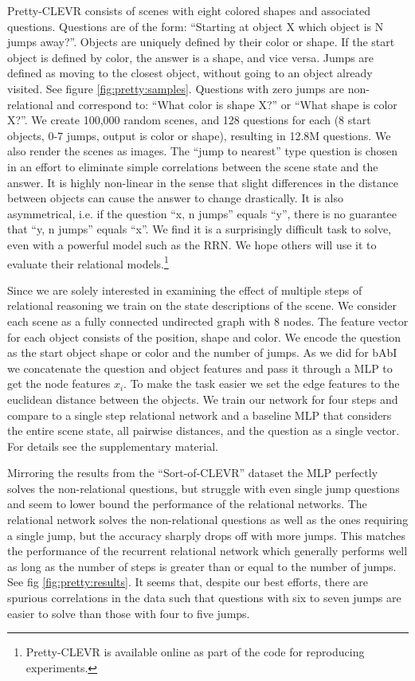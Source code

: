 \documentclass{article}
\begin{document}
Pretty-CLEVR consists of scenes with eight colored shapes and associated questions. Questions are of the form: ``Starting at object X which object is N jumps away?''. Objects are uniquely defined by their color or shape. If the start object is defined by color, the answer is a shape, and vice versa. Jumps are defined as moving to the closest object, without going to an object already visited. See figure \ref{fig:pretty:samples}. 
Questions with zero jumps are non-relational and correspond to: ``What color is shape X?'' or ``What shape is color X?''. We create 100,000 random scenes, and 128 questions for each (8 start objects, 0-7 jumps, output is color or shape), resulting in 12.8M questions. We also render the scenes as images. The ``jump to nearest'' type question is chosen in an effort to eliminate simple correlations between the scene state and the answer. It is highly non-linear in the sense that slight differences in the distance between objects can cause the answer to change drastically. It is also asymmetrical, i.e. if the question ``x, n jumps'' equals ``y'', there is no guarantee that ``y, n jumps'' equals ``x''. We find it is a surprisingly difficult task to solve, even with a powerful model such as the RRN. We hope others will use it to evaluate their relational models.\footnote{Pretty-CLEVR is available online as part of the code for reproducing experiments.}

Since we are solely interested in examining the effect of multiple steps of relational reasoning we train on the state descriptions of the scene. We consider each scene as a fully connected undirected graph with 8 nodes. The feature vector for each object consists of the position, shape and color. We encode the question as the start object shape or color and the number of jumps. As we did for bAbI we concatenate the question and object features and pass it through a MLP to get the node features $x_i$. To make the task easier we set the edge features to the euclidean distance between the objects. We train our network for four steps and compare to a single step relational network and a baseline MLP that considers the entire scene state, all pairwise distances, and the question as a single vector. For details see the supplementary material.

Mirroring the results from the ``Sort-of-CLEVR'' dataset the MLP perfectly solves the non-relational questions, but struggle with even single jump questions and seem to lower bound the performance of the relational networks. The relational network solves the non-relational questions as well as the ones requiring a single jump, but the accuracy sharply drops off with more jumps. This matches the performance of the recurrent relational network which generally performs well as long as the number of steps is greater than or equal to the number of jumps. See fig \ref{fig:pretty:results}. It seems that, despite our best efforts, there are spurious correlations in the data such that questions with six to seven jumps are easier to solve than those with four to five jumps.
\end{document}
